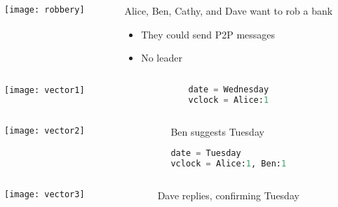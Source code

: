 \documentclass[aspectratio=169, 15pt,usenames,dvipsnames]{beamer}
\begin{document}
{\begin{gdblank}
\begin{columns}
			\begin{column}{0.5\textwidth}
				\texttt{[image: robbery]}			
			\end{column}
			\begin{column}{0.5\textwidth}
				Alice, Ben, Cathy, and Dave want to rob a bank
				\begin{itemize}
					\item They could send P2P messages
					\item No leader
				\end{itemize}
			\end{column}	
		\end{columns}
	\end{gdblank}	
	\cprotEnv\begin{gdblank}
	\begin{columns}
		\begin{column}{0.5\textwidth}
			\texttt{[image: vector1]}			
		\end{column}
		\begin{column}{0.5\textwidth}				
			\begin{lstlisting}[language=Python]
date = Wednesday
vclock = Alice:1
			\end{lstlisting}
		\end{column}	
	\end{columns} 
	\end{gdblank}
	\cprotEnv\begin{gdblank}
	\begin{columns}
		\begin{column}{0.5\textwidth}
			\texttt{[image: vector2]}			
		\end{column}
		\begin{column}{0.5\textwidth}				
			Ben suggests Tuesday
			\begin{lstlisting}[language=Python]
date = Tuesday
vclock = Alice:1, Ben:1
			\end{lstlisting}
		\end{column}	
	\end{columns} 
	\end{gdblank}
	\cprotEnv\begin{gdblank}
	\begin{columns}
		\begin{column}{0.5\textwidth}
			\texttt{[image: vector3]}			
		\end{column}
		\begin{column}{0.5\textwidth}				
			Dave replies, confirming Tuesday

\end{column}
\end{columns}
\end{gdblank}}
\end{document}
